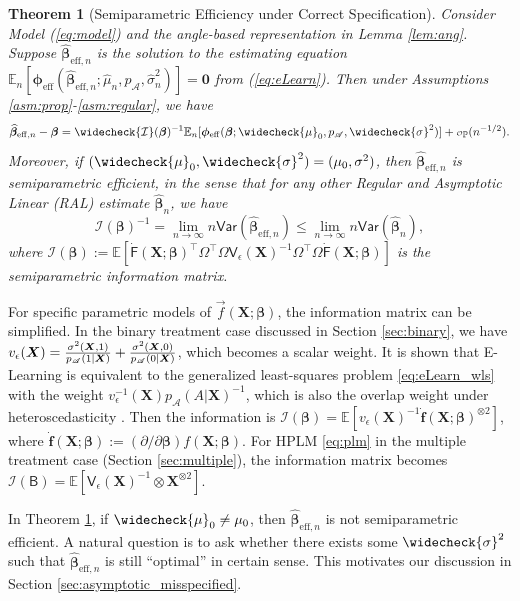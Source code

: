 \documentclass[11pt]{article}
\newtheorem{thm}{Theorem}
\theoremstyle{definition}
\theoremstyle{remark}
\newcommand{\fb}{\mathbf{f}}
\newcommand{\bX}{\bm{X}}
\newcommand{\bbeta}{\bm{\beta}}
\newcommand{\bphi}{\bm{\phi}}
\newcommand{\bbE}{\mathbb{E}}
\newcommand{\bbP}{\mathbb{P}}
\newcommand{\cI}{\mathcal{I}}
\newcommand{\sA}{\mathscr{A}}
\newcommand{\sfB}{\mathsf{B}}
\newcommand{\sfF}{\mathsf{F}}
\newcommand{\sfV}{\mathsf{V}}
\newcommand\smallcO{
	\mathchoice
	{{\scriptscriptstyle\mathcal{O}}}%
	{{\scriptscriptstyle\mathcal{O}}}%
	{{\scriptscriptstyle\mathcal{O}}}%
	{\scalebox{.5}{$\scriptscriptstyle\mathcal{O}$}}%
}
\newcommand{\sfvar}{\mathsf{Var}}
\newcommand{\bzero}{\mathbf{0}}	%
\newcommand{\eff}{\mathrm{eff}}
\begin{document}
\begin{thm}[Semiparametric Efficiency under Correct Specification]\label{thm:eff}
	Consider Model (\ref{eq:model}) and the angle-based representation in Lemma \ref{lem:ang}. Suppose $ \widehat{\bbeta}_{\eff,n} $ is the solution to the estimating equation $ \bbE_{n}[\bphi_{\eff}(\widehat{\bbeta}_{\eff,n};\widehat{\mu}_{n},p_{\sA},\widehat{\sigma}_{n}^{2})] = \bzero $ from (\ref{eq:eLearn}). Then under Assumptions \ref{asm:prop}-\ref{asm:regular}, we have
	\[ \widehat{\bbeta}_{\eff,n} - \bbeta = \widecheck{\cI}(\bbeta)^{-1}\bbE_{n}[\bphi_{\eff}(\bbeta;\widecheck{\mu}_{0},p_{\sA},\widecheck{\sigma}^{2})] + \smallcO_{\bbP}(n^{-1/2}). \]
	Moreover, if $ (\widecheck{\mu}_{0},\widecheck{\sigma}^{2}) = (\mu_{0},\sigma^{2}) $, then $ \widehat{\bbeta}_{\eff,n} $ is semiparametric efficient, in the sense that for any other \textit{Regular and Asymptotic Linear (RAL)} estimate $ \widehat{\bbeta}_{n} $, we have
	\[ \cI(\bbeta)^{-1} = \lim_{n\to\infty}n\sfvar(\widehat{\bbeta}_{\eff,n}) \le \lim_{n\to\infty}n\sfvar(\widehat{\bbeta}_{n}), \]
	where $ \cI(\bbeta) := \bbE\left[ \dot{\sfF}(\bX;\bbeta)^{\intercal}\Omega^{\intercal}\Omega\sfV_{\epsilon}(\bX)^{-1}\Omega^{\intercal}\Omega\dot{\sfF}(\bX;\bbeta) \right] $ is the semiparametric information matrix.
\end{thm}

For specific parametric models of $ \vec{f}(\bX;\bbeta) $, the information matrix can be simplified. In the binary treatment case discussed in Section \ref{sec:binary}, we have $ v_{\epsilon}(\bX) = {\sigma^{2}(\bX,1) \over p_{\sA}(1|\bX)} + {\sigma^{2}(\bX,0) \over p_{\sA}(0|\bX)} $, which becomes a scalar weight. It is shown that E-Learning is equivalent to the generalized least-squares problem \eqref{eq:eLearn_wls} with the weight $ v_{\epsilon}^{-1}(\bX)p_{\sA}(A|\bX)^{-1} $, which is also the overlap weight under heteroscedasticity \citep{crump2006moving,li2019propensity}. Then the information is $ \cI(\bbeta) = \bbE[v_{\epsilon}(\bX)^{-1}\dot{\fb}(\bX;\bbeta)^{\otimes 2}] $, where $ \dot{\fb}(\bX;\bbeta) := (\partial/\partial\bbeta)f(\bX;\bbeta) $. For HPLM \eqref{eq:plm} in the multiple treatment case (Section \ref{sec:multiple}), the information matrix becomes $ \cI(\sfB) = \bbE\left[ \sfV_{\epsilon}(\bX)^{-1} \otimes \bX^{\otimes 2} \right] $.

In Theorem \ref{thm:eff}, if $ \widecheck{\mu}_{0} \ne \mu_{0} $, then $ \widehat{\bbeta}_{\eff,n} $ is not semiparametric efficient. A natural question is to ask whether there exists some $ \widecheck{\sigma}^{2} $ such that $ \widehat{\bbeta}_{\eff,n} $ is still ``optimal'' in certain sense. This motivates our discussion in Section \ref{sec:asymptotic_misspecified}.
\end{document}
